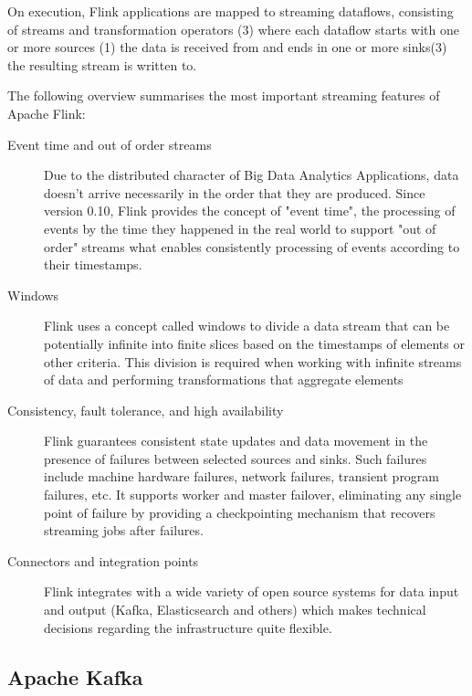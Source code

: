 On execution, Flink applications are mapped to streaming dataflows, consisting of streams
and transformation operators (3) where each dataflow starts with one or more sources (1)
the data is received from and ends in one or more sinks(3) the resulting stream is written
to.

The following overview summarises the most important streaming features of Apache Flink:

\begin{description}
    \item [Event time and out of order streams]
    Due to the distributed character of Big Data Analytics Applications, data doesn't arrive
    necessarily in the order that they are produced. Since version 0.10, Flink provides the
    concept of "event time", the processing of events by the time they happened in the real
    world to support "out of order" streams what enables consistently processing of events
    according to their timestamps.

    \item [Windows]
    Flink uses a concept called windows to divide a data stream that can be potentially infinite
    into finite slices based on the timestamps of elements or other criteria. This division
    is required when working with infinite streams of data and performing transformations that
    aggregate elements

    \item [Consistency, fault tolerance, and high availability]
    Flink guarantees consistent state updates and data movement in the presence of failures
    between selected sources and sinks. Such failures include machine hardware failures, network
    failures, transient program failures, etc. It supports worker and master failover,
    eliminating any single point of failure by providing  a checkpointing mechanism that recovers
    streaming jobs after failures.

    \item [Connectors and integration points]
    Flink integrates with a wide variety of open source systems for data input and output (Kafka,
    Elasticsearch and others) which makes technical decisions regarding the infrastructure quite flexible.
\end{description}

\subsection{Apache Kafka}

